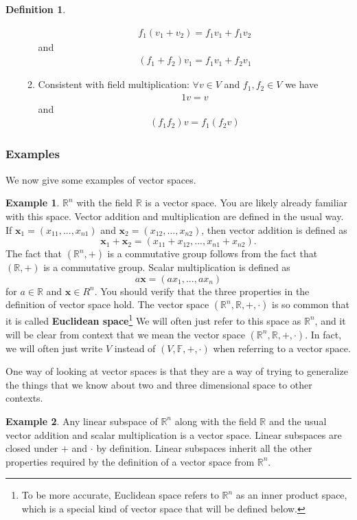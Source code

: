 \documentclass[12pt,reqno]{amsart}
\def\F{\mathbb{F}}
\def\R{\mathbb{R}}
\theoremstyle{definition}
\newtheorem{definition}{Definition}[section]
\newtheorem{example}{Example}[section]
\begin{document}
\begin{definition}
\begin{enumerate}
\begin{enumerate}
\begin{align*}
        f_1 (v_1 + v_2) = f_1 v_1 + f_1 v_2 
      \end{align*}
      and 
      \begin{align*}
        (f_1 + f_2)v_1 = f_1 v_1 + f_2 v_1
      \end{align*}
    \item Consistent with field multiplication: $\forall v \in V$ and
      $f_1, f_2 \in V$ we have
      \begin{align*}
        1 v = v
      \end{align*}
      and 
      \begin{align*}
        (f_1 f_2) v =f_1 (f_2 v)
      \end{align*}
    \end{enumerate}
  \end{enumerate}
\end{definition}

\subsubsection{Examples}
We now give some examples of vector spaces. 
\begin{example} \label{ex:Rn}
  $\R^n$ with the field $\R$ is a vector space. You are likely already
  familiar with this space. Vector addition and multiplication are
  defined in the usual way. If $\mathbf{x}_1 = (x_{11}, ..., x_{n1})$
  and $\mathbf{x}_2 = (x_{12}, ..., x_{n2})$, then vector addition is
  defined as
  \[ \mathbf{x}_1 + \mathbf{x}_2 = (x_{11}+x_{12}, ... , x_{n1} +
  x_{n2}). \]
  The fact that $(\R^n,+)$ is a commutative group follows from the
  fact that $(\R,+)$ is a commutative group. Scalar multiplication is
  defined as
  \[ a \mathbf{x} = (a x_1, ..., ax_n) \] for $a \in \R$ and
  $\mathbf{x} \in R^n$. You should verify that the three properties in
  the definition of vector space hold.  The vector space $(\R^n, \R,
  +, \cdot)$ is so common that it is called \textbf{Euclidean
    space}\footnote{To be more accurate, Euclidean space refers to
    $\R^n$ as an inner product space, which is a special kind of
    vector space that will be defined below.} We will often just refer
  to this space as $\R^n$, and it will be clear from context that we
  mean the vector space $(\R^n, \R, + , \cdot)$. In fact, we will
  often just write $V$ instead of $(V,\F,+,\cdot)$ when referring to a
  vector space.
\end{example}
One way of looking at vector spaces is that they are a way of trying
to generalize the things that we know about two and three dimensional
space to other contexts. 
\begin{example}
  Any linear subspace of $\R^n$ along with the field
  $\R$ and the usual vector addition and scalar multiplication is a
  vector space. Linear subspaces are closed under $+$ and $\cdot$ by
  definition. Linear subspaces inherit all the other properties
  required by the definition of a vector space from $\R^n$.
\end{example}
\end{document}

